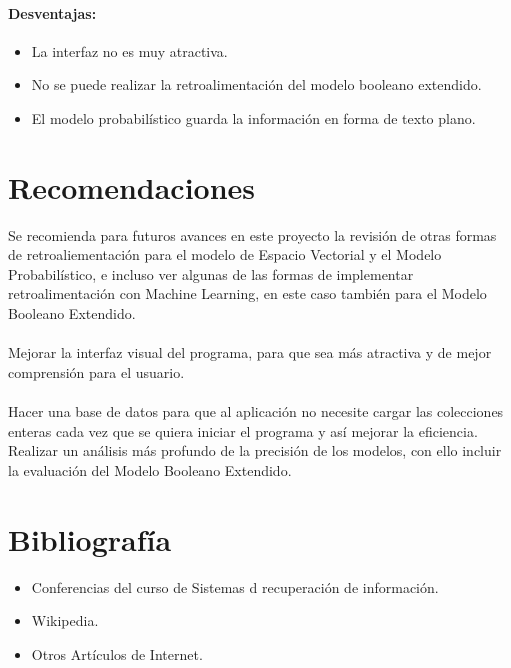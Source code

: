 \documentclass{llncs}
\begin{document}
	\paragraph*{Desventajas:}
	\begin{itemize}
		\item La interfaz no es muy atractiva.
		\item No se puede realizar la retroalimentaci\'on del modelo booleano extendido.
		\item El modelo probabil\'istico guarda la informaci\'on en forma de texto plano.
    \end{itemize}

	\section{Recomendaciones}
	Se recomienda para futuros avances en este proyecto la revisi\'on de otras formas de retroaliementaci\'on para el modelo de Espacio Vectorial
	y el Modelo Probabil\'istico, e incluso ver algunas de las formas de implementar retroalimentaci\'on con Machine Learning, en este caso tambi\'en 
	para el Modelo Booleano Extendido.\\
	\\

	Mejorar la interfaz visual del programa, para que sea m\'as atractiva y de mejor comprensi\'on para el usuario.\\
	\\

	Hacer una base de datos para que al aplicaci\'on no necesite cargar las colecciones 
	enteras cada vez que se quiera iniciar el programa y as\'i mejorar la eficiencia.\\

	Realizar un an\'alisis m\'as profundo de la precisi\'on de los modelos, con ello incluir la evaluaci\'on del Modelo Booleano Extendido.\\

	\section*{Bibliograf\'ia}
	\begin{itemize}
		\item Conferencias del curso de Sistemas d recuperaci\'on de informaci\'on.
		\item Wikipedia.
		\item Otros Art\'iculos de Internet.
	\end{itemize}
\end{document}

